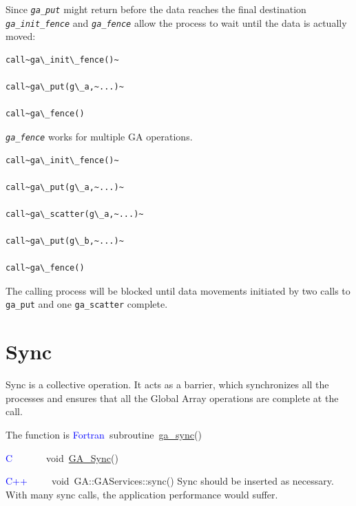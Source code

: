 \textit{}

Since \texttt{\emph{ga\_put}} might return before the data reaches
the final destination \texttt{\emph{ga\_init\_fence}} and \texttt{\emph{ga\_fence}}
allow the process to wait until the data is actually moved:
\begin{verbatim}
call~ga\_init\_fence()~

call~ga\_put(g\_a,~...)~

call~ga\_fence()
\end{verbatim}
\textit{}

\texttt{\emph{ga\_fence}} works for multiple GA operations.
\begin{verbatim}
call~ga\_init\_fence()~

call~ga\_put(g\_a,~...)~

call~ga\_scatter(g\_a,~...)~

call~ga\_put(g\_b,~...)~

call~ga\_fence()
\end{verbatim}
The calling process will be blocked until data movements initiated
by two calls to \texttt{ga\_put} and one \texttt{ga\_scatter} complete. 


\section{Sync }

Sync is a collective operation. It acts as a barrier, which synchronizes
all the processes and ensures that all the Global Array operations
are complete at the call.

The function is
\textcolor{blue}{Fortran}~subroutine~\href{http://www.emsl.pnl.gov/docs/global/ga_ops.html\#ga_sync}{ga\_{}sync}()~

\textcolor{blue}{C}~~~~~~~void~\href{http://www.emsl.pnl.gov/docs/global/c_nga_ops.html\#ga_sync}{GA\_{}Sync}()~

\textcolor{blue}{C++}~~~~~void~GA::GAServices::sync()
Sync should be inserted as necessary. With many sync calls, the application
performance would suffer. 
